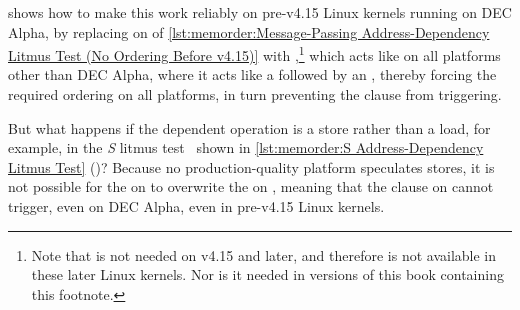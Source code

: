 \begin{fcvref}
shows how to make this work reliably on pre-v4.15 Linux kernels running on
DEC Alpha, by replacing  on  of
\cref{lst:memorder:Message-Passing Address-Dependency Litmus Test (No Ordering Before v4.15)}
with ,\footnote{
	Note that  is not needed on v4.15 and
	later, and therefore is not available in these later Linux kernels.
	Nor is it needed in versions of this book containing this footnote.}
which acts like  on all platforms other than DEC Alpha,
where it acts like a  followed by an ,
thereby forcing the required ordering on all platforms, in turn
preventing the  clause from triggering.
\end{fcvref}

\begin{listing}

\caption{S Address-Dependency Litmus Test}
\label{lst:memorder:S Address-Dependency Litmus Test}
\end{listing}

\begin{fcvref}
But what happens if the dependent operation is a store rather than
a load, for example, in the \emph{S}
litmus test~\cite{JadeAlglave2011ppcmem} shown in
\cref{lst:memorder:S Address-Dependency Litmus Test}
()?
Because no production-quality platform speculates stores,
it is not possible for the  on  to overwrite
the  on , meaning that the 
clause on  cannot trigger, even on DEC Alpha, even
in pre-v4.15 Linux kernels.
\end{fcvref}

